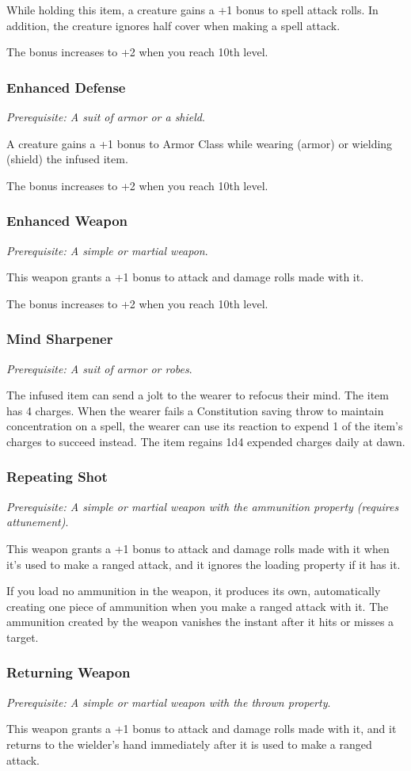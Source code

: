         While holding this item, a creature gains a +1 bonus to spell attack rolls. In addition, the creature ignores half cover when making a spell attack.

        The bonus increases to +2 when you reach 10th level.
    \subsubsection{Enhanced Defense}
        \textit{Prerequisite: A suit of armor or a shield}.

        A creature gains a +1 bonus to Armor Class while wearing (armor) or wielding (shield) the infused item.

        The bonus increases to +2 when you reach 10th level.
    \subsubsection{Enhanced Weapon}
        \textit{Prerequisite: A simple or martial weapon}.

        This weapon grants a +1 bonus to attack and damage rolls made with it.

        The bonus increases to +2 when you reach 10th level.
    \subsubsection{Mind Sharpener}
        \textit{Prerequisite: A suit of armor or robes}.

        The infused item can send a jolt to the wearer to refocus their mind.
        The item has 4 charges.
        When the wearer fails a Constitution saving throw to maintain concentration on a spell, the wearer can use its reaction to expend 1 of the item's charges to succeed instead.
        The item regains 1d4 expended charges daily at dawn.
    \subsubsection{Repeating Shot}
        \textit{Prerequisite: A simple or martial weapon with the ammunition property (requires attunement)}.

        This weapon grants a +1 bonus to attack and damage rolls made with it when it's used to make a ranged attack, and it ignores the loading property if it has it.

        If you load no ammunition in the weapon, it produces its own, automatically creating one piece of ammunition when you make a ranged attack with it.
        The ammunition created by the weapon vanishes the instant after it hits or misses a target.
    \subsubsection{Returning Weapon}
        \textit{Prerequisite: A simple or martial weapon with the thrown property}.

        This weapon grants a +1 bonus to attack and damage rolls made with it, and it returns to the wielder's hand immediately after it is used to make a ranged attack.

\newpage
